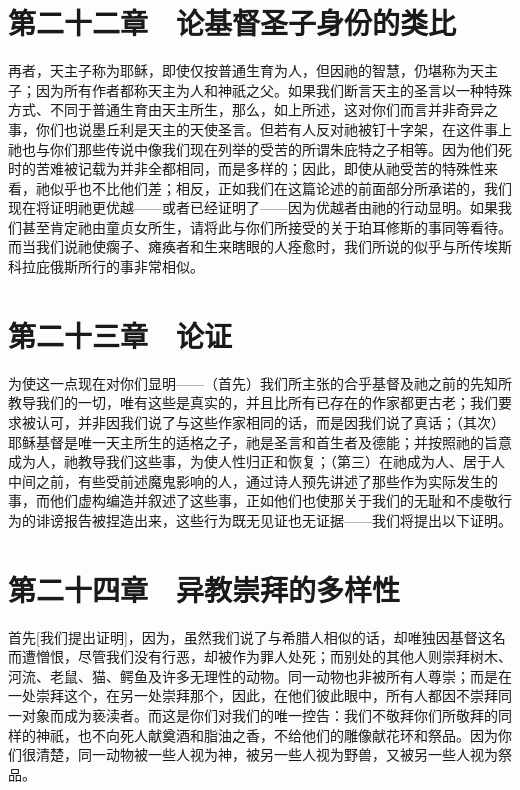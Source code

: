 
\section{第二十二章　论基督圣子身份的类比}

再者，天主子称为耶稣，即使仅按普通生育为人，但因祂的智慧，仍堪称为天主子；因为所有作者都称天主为人和神祇之父。如果我们断言天主的圣言以一种特殊方式、不同于普通生育由天主所生，那么，如上所述，这对你们而言并非奇异之事，你们也说墨丘利是天主的天使圣言。但若有人反对祂被钉十字架，在这件事上祂也与你们那些传说中像我们现在列举的受苦的所谓朱庇特之子相等。因为他们死时的苦难被记载为并非全都相同，而是多样的；因此，即使从祂受苦的特殊性来看，祂似乎也不比他们差；相反，正如我们在这篇论述的前面部分所承诺的，我们现在将证明祂更优越——或者已经证明了——因为优越者由祂的行动显明。如果我们甚至肯定祂由童贞女所生，请将此与你们所接受的关于珀耳修斯的事同等看待。而当我们说祂使瘸子、瘫痪者和生来瞎眼的人痊愈时，我们所说的似乎与所传埃斯科拉庇俄斯所行的事非常相似。\par


\section{第二十三章　论证}

为使这一点现在对你们显明——（首先）我们所主张的合乎基督及祂之前的先知所教导我们的一切，唯有这些是真实的，并且比所有已存在的作家都更古老；我们要求被认可，并非因我们说了与这些作家相同的话，而是因我们说了真话；（其次）耶稣基督是唯一天主所生的适格之子，祂是圣言和首生者及德能；并按照祂的旨意成为人，祂教导我们这些事，为使人性归正和恢复；（第三）在祂成为人、居于人中间之前，有些受前述魔鬼影响的人，通过诗人预先讲述了那些作为实际发生的事，而他们虚构编造并叙述了这些事，正如他们也使那关于我们的无耻和不虔敬行为的诽谤报告被捏造出来，这些行为既无见证也无证据——我们将提出以下证明。\par


\section{第二十四章　异教崇拜的多样性}

首先[我们提出证明]，因为，虽然我们说了与希腊人相似的话，却唯独因基督这名而遭憎恨，尽管我们没有行恶，却被作为罪人处死；而别处的其他人则崇拜树木、河流、老鼠、猫、鳄鱼及许多无理性的动物。同一动物也非被所有人尊崇；而是在一处崇拜这个，在另一处崇拜那个，因此，在他们彼此眼中，所有人都因不崇拜同一对象而成为亵渎者。而这是你们对我们的唯一控告：我们不敬拜你们所敬拜的同样的神祇，也不向死人献奠酒和脂油之香，不给他们的雕像献花环和祭品。因为你们很清楚，同一动物被一些人视为神，被另一些人视为野兽，又被另一些人视为祭品。\par

